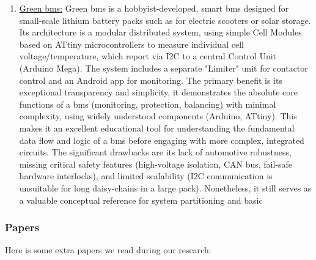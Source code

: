 \begin{enumerate}
	\item \href{https://hackaday.io/project/181453-green-\gls{bms}}{Green \gls{bms}:} Green \gls{bms} is a hobbyist-developed, smart \gls{bms} designed for small-scale lithium battery packs such as for electric scooters or solar storage. Its architecture is a modular distributed system, using simple Cell Modules based on ATtiny microcontrollers to measure individual cell voltage/temperature, which report via I2C to a central Control Unit (Arduino Mega). The system includes a separate "Limiter" unit for contactor control and an Android app for monitoring. The primary benefit is its exceptional transparency and simplicity, it demonstrates the absolute core functions of a \gls{bms} (monitoring, protection, balancing) with minimal complexity, using widely understood components (Arduino, ATtiny). This makes it an excellent educational tool for understanding the fundamental data flow and logic of a \gls{bms} before engaging with more complex, integrated circuits. The significant drawbacks are its lack of automotive robustness, missing critical safety features (high-voltage isolation, CAN bus, fail-safe hardware interlocks), and limited scalability (I2C communication is unsuitable for long daisy-chains in a large pack). Nonetheless, it still serves as a valuable conceptual reference for system partitioning and basic 
\end{enumerate}

\subsubsection{Papers}
Here is some extra papers we read during our research:

